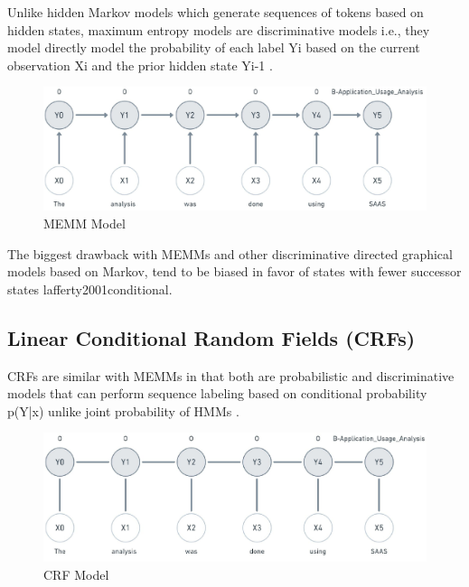 Unlike hidden Markov models which generate sequences of tokens based on hidden states, maximum entropy models are discriminative models i.e., they model directly model the probability of each label Yi based on the current observation Xi and the prior hidden state Yi-1 \citep{mccallum2000maximum}. 

\begin{figure}[htbp]
	\centering
	\includegraphics[width=1\textwidth]{4.graphics/figures/models/pdf/MEMM}
	\caption{MEMM Model}
	\label{fig:chapter03:setup}
\end{figure}

The biggest drawback with MEMMs and other discriminative directed graphical models based on Markov, tend to be biased in favor of states with fewer successor states {lafferty2001conditional}. 

\subsection{Linear Conditional Random Fields (CRFs)}
\label{sec:chapter05:MLModels:CRFs}

CRFs are similar with MEMMs in that both are probabilistic and discriminative models that can perform sequence labeling based on conditional probability p(Y|x) unlike joint probability of HMMs \citep{wallach2004conditional}. 

\begin{figure}[htbp]
	\centering
	\includegraphics[width=1\textwidth]{4.graphics/figures/models/pdf/CRF}
	\caption{CRF Model}
	\label{fig:chapter03:setup}
\end{figure}

